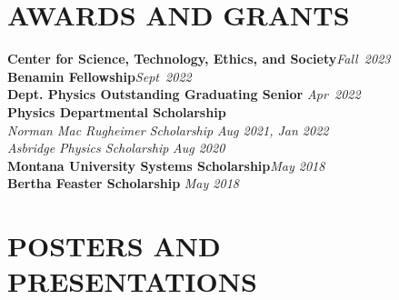 \documentclass[margin]{res}
\begin{document}
\begin{resume}
\section{\uppercase{Awards and Grants}}
\textbf{Center for Science, Technology, Ethics, and Society}\hfill {\sl Fall~2023}\vspace*{1ex}\\
\textbf{Benamin Fellowship}\hfill {\sl Sept~2022}\vspace*{1ex}\\
\textbf{Dept. Physics Outstanding Graduating Senior} \hfill {\sl Apr~2022}\vspace*{1ex}\\
\textbf{Physics Departmental Scholarship}\\
\hspace{2ex} {\sl Norman Mac Rugheimer Scholarship} \hfill {\sl Aug 2021, Jan 2022}\\
\hspace{2ex} {\sl Asbridge Physics Scholarship} \hfill {\sl Aug 2020}\vspace*{1ex}\\
\textbf{Montana University Systems Scholarship}\hfill\hfil {\sl May 2018}\vspace*{1ex}\\
\textbf{Bertha Feaster Scholarship} \hfill {\sl May 2018}

\section{\uppercase{Posters and Presentations}}


\end{resume}
\end{document}
